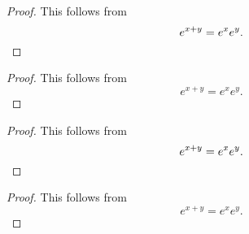 \documentclass{experimento}
\begin{document}
\begin{proof}
  This follows from
  $$e^{x+y}=e^xe^y. \qedhere$$
\end{proof}

\begin{proof}
  This follows from
  $$e^{x+y}=e^xe^y.$$
\end{proof}

\begin{proof}
  This follows from
  \[e^{x+y}=e^xe^y. \qedhere\]
\end{proof}
\begin{proof}
  This follows from
  \[e^{x+y}=e^xe^y. \]
\end{proof}
\end{document}
